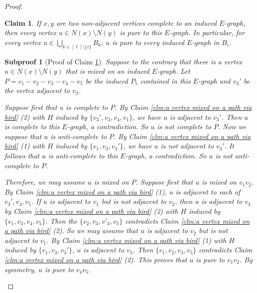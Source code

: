 \documentclass[10pt,a4paper]{amsart}
\newtheorem{claim}{Claim}
\newtheorem{subproof}{Subproof}
\begin{document}
\begin{proof}
        \begin{claim}\label{clm:homo structure}
            If $x,y$ are two non-adjacent vertices complete to an induced $E$-graph,
            then every vertex $u\in N(x)\setminus N(y)$ is pure to this $E$-graph. 
            In particular, for every vertex $u\in \bigcup_{k\in [\ell]\setminus \{i\}} B_k$, $u$ is pure to every induced $E$-graph in $B_i$. 
        \end{claim}
        \begin{subproof}[Proof of Claim \ref{clm:homo structure}]
            Suppose to the contrary that there is a vertex $u\in N(x)\setminus N(y)$ that is mixed on an induced $E$-graph. 
            Let $P=v_1-v_2-v_3-v_4-v_5$ be the induced $P_5$ contained in this $E$-graph and $v_3'$ be the vertex adjacent to $v_3$. 
            
            Suppose first that $u$ is complete to $P$.  
            By Claim \ref{clm:a vertex mixed on a path via bird} (2) with $H$ induced by $\{v_3',v_3,v_4,v_1\}$, we have $u$ is adjacent to $v_3'$.   
            Then $u$ is complete to this $E$-graph, a contradiction. 
            So $u$ is not complete to $P$. 
            Now we suppose that $u$ is anti-complete to $P$. 
            By Claim \ref{clm:a vertex mixed on a path via bird} (1) with $H$ induced by $\{v_1,v_3,v_3'\}$, we have $u$ is not adjacent to $v_3'$. 
            It follows that $u$ is anti-complete to this $E$-graph, a contradiction. 
            So $u$ is not anti-complete to $P$. 

            Therefore, we may assume $u$ is mixed on $P$.
            Suppose first that $u$ is mixed on $v_1v_2$. 
            By Claim \ref{clm:a vertex mixed on a path via bird} (1), $u$ is adjacent to each of $v_3',v_4,v_5$.
            If $u$ is adjacent to $v_1$ but is not adjacent to $v_2$, then $u$ is adjacent to $v_3$
            by Claim \ref{clm:a vertex mixed on a path via bird} (2) with $H$ induced by $\{v_1,v_3,v_4,v_5\}$.
            Then the $\{v_2,v_3,v'_3,v_5\}$ contradicts 
            Claim \ref{clm:a vertex mixed on a path via bird} (2).
            So we may assume that $u$ is adjacent to $v_2$ but is not adjacent to $v_1$. 
            By Claim \ref{clm:a vertex mixed on a path via bird} (1) with $H$ induced by $\{v_1,v_3,v_3'\}$, $u$ is adjacent to $v_3$. Then $\{v_1,v_2,v_3,v_5\}$ contradicts Claim \ref{clm:a vertex mixed on a path via bird} (2).
            This proves that $u$ is pure to $v_1v_2$.
            By symmetry, $u$ is pure to $v_4v_5$. 


\end{subproof}
\end{proof}
\end{document}
